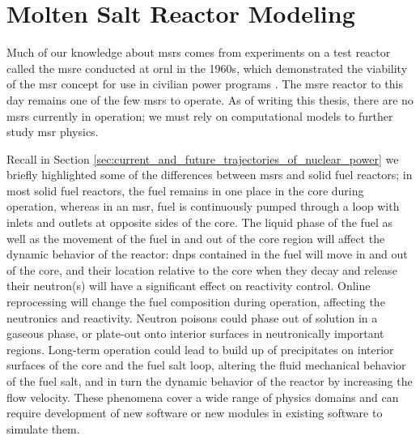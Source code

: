 \chapter{Molten Salt Reactor Modeling}%
\label{ch:chapter2}
\glsresetall
Much of our knowledge about \gls{msr}s comes from experiments on a test reactor
called the \Gls{msre} conducted at \Gls{ornl} in the 1960s, which demonstrated
the viability of the \Gls{msr} concept for use in civilian power programs
\cite{haubenreich_experience_1970} \cite{rosenthal_history_1970}.
The \Gls{msre} reactor to this day remains one of the few \Gls{msr}s to operate.
As of writing this thesis, there are no \Gls{msr}s currently in operation; we
must rely on computational models to further study \Gls{msr}
physics. 

Recall in Section \ref{sec:current_and_future_trajectories_of_nuclear_power}
we briefly highlighted some of the differences between \Gls{msr}s and
solid fuel reactors; in most solid fuel reactors, the fuel remains
in one place in the core during operation, whereas in an \Gls{msr}, fuel is continuously pumped
through a loop with inlets and outlets at opposite sides of the core. 
The liquid phase of the fuel as well as the movement of the fuel
in and out of the core region will affect the dynamic behavior of the
reactor: \gls{dnp}s contained in the fuel will move in and out of the core, and their
location relative to the core when they decay and release their neutron(s) will have a
significant effect on reactivity control. Online reprocessing will change the fuel composition
during operation, affecting the neutronics and reactivity. Neutron poisons could phase out of solution
in a gaseous phase, or plate-out onto interior surfaces in neutronically important regions.
Long-term operation could lead to build up of precipitates on interior surfaces of the core
and the fuel salt loop, altering the fluid mechanical behavior of the fuel salt, and in turn
the dynamic behavior of the reactor by increasing the flow velocity. These
phenomena cover a wide range of physics domains and can
require development of new software or new modules in existing software
to simulate them.

